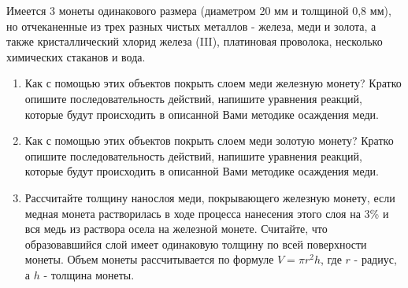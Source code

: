 
Имеется 3 монеты одинакового размера (диаметром 20 мм и толщиной 0,8 мм), но отчеканенные  из трех разных чистых 
металлов - железа, меди и золота, а также кристаллический хлорид железа (III), платиновая проволока, несколько 
химических стаканов и вода.

\begin{enumerate}
    \item Как с помощью этих объектов покрыть слоем меди железную монету? 
    Кратко опишите последовательность действий, напишите уравнения реакций, которые будут происходить в описанной Вами методике осаждения меди.
    \item Как с помощью этих объектов покрыть слоем меди золотую монету? 
    Кратко опишите последовательность действий, напишите уравнения реакций, которые будут происходить в описанной Вами методике осаждения меди.
    \item Рассчитайте толщину нанослоя меди, покрывающего железную монету, если медная монета растворилась в ходе 
    процесса нанесения этого слоя на 3\% и вся медь из раствора осела на железной монете. Считайте, что 
    образовавшийся слой имеет одинаковую толщину по всей поверхности монеты. Объем монеты рассчитывается по 
    формуле $V = \pi r^2 h$, где $r$ - радиус, а $h$ - толщина монеты.    
\end{enumerate}

